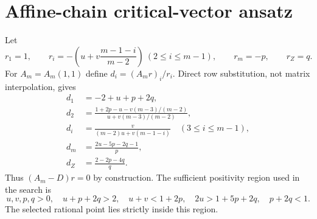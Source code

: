 \section*{Affine-chain critical-vector ansatz}
Let
\[
r_1=1,
\qquad
r_i=-\left(u+v\frac{m-1-i}{m-2}\right)\ (2\le i\le m-1),
\qquad
r_m=-p,
\qquad
r_Z=q.
\]
For $A_m=A_m(1,1)$ define $d_i=(A_mr)_i/r_i$.  Direct row substitution,
not matrix interpolation, gives
\begin{align*}
d_1&=-2+u+p+2q,\\
d_2&=\frac{1+2p-u-v(m-3)/(m-2)}{u+v(m-3)/(m-2)},\\
d_i&=\frac{v}{(m-2)u+v(m-1-i)}\quad(3\le i\le m-1),\\
d_m&=\frac{2u-5p-2q-1}{p},\\
d_Z&=\frac{2-2p-4q}{q}.
\end{align*}
Thus $(A_m-D)r=0$ by construction.  The sufficient positivity region used in
the search is
\[
u,v,p,q>0,
\quad u+p+2q>2,
\quad u+v<1+2p,
\quad2u>1+5p+2q,
\quad p+2q<1.
\]
The selected rational point lies strictly inside this region.

